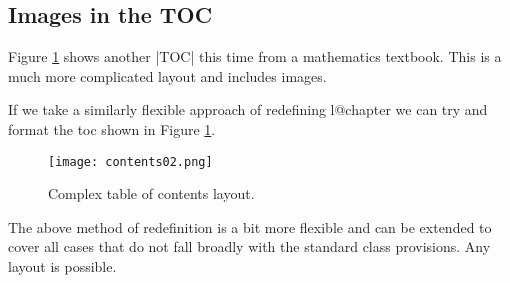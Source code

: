 

\subsection{Images in the TOC}
Figure \ref{fig:tocsteward} shows another |TOC| this time from a mathematics textbook. This is a much more complicated layout and includes images.

If we take a similarly flexible approach of redefining l@chapter we can try and format the toc shown in Figure \ref{fig:tocsteward}.

\begin{figure}[tp]
\centering

\texttt{[image: contents02.png]}
\caption{Complex table of contents layout.}
\label{fig:tocsteward}
\end{figure}



\begin{teX}
\renewcommand\l@chapter[3]{%
  \ifnum \c@tocdepth >\m@ne
    \addpenalty{-\@highpenalty}%
    \vskip 1.0em \@plus\p@
    \begingroup
      \parindent \z@
      \leavevmode
      \vbox{\raggedright\colorbox{blue}{\color{white}\bfseries \sffamily#1} #2\qquad  #3\vskip0pt%
      \color{blue}\hrule width0.7\textwidth height0.4pt}\par
      \penalty\@highpenalty
    \endgroup
  \fi}
\end{teX}




The above method of redefinition is a bit more flexible and can be extended to cover all cases that do not fall broadly with the standard class provisions. Any layout is possible.



